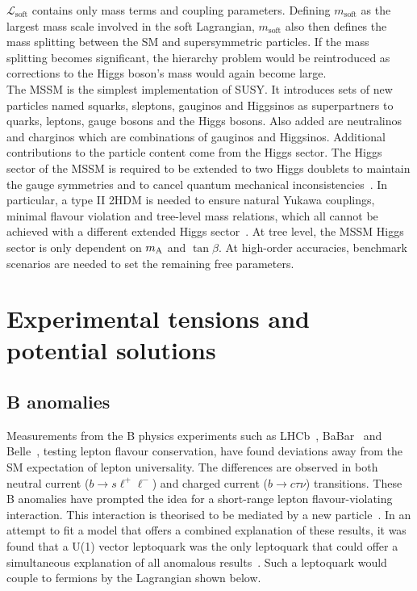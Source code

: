 $\mathcal{L}_{\text{soft}}$ contains only mass terms and coupling parameters. 
Defining $m_{\text{soft}}$ as the largest mass scale involved in the soft Lagrangian, $m_{\text{soft}}$ also then defines the mass splitting between the \ac{SM} and supersymmetric particles. 
If the mass splitting becomes significant, the hierarchy problem would be reintroduced as corrections to the Higgs boson's mass would again become large. \\

The \ac{MSSM} is the simplest implementation of \ac{SUSY}.
It introduces sets of new particles named squarks, sleptons, gauginos and Higgsinos as superpartners to quarks, leptons, gauge bosons and the Higgs bosons.
Also added are neutralinos and charginos which are combinations of gauginos and Higgsinos.
Additional contributions to the particle content come from the Higgs sector.
The Higgs sector of the \ac{MSSM} is required to be extended to two Higgs doublets to maintain the gauge symmetries and to cancel quantum mechanical inconsistencies~\cite{SUSY_Primer}.
In particular, a type II \ac{2HDM} is needed to ensure natural Yukawa couplings, minimal flavour violation and tree-level mass relations, which all cannot be achieved with a different extended Higgs sector~\cite{SUSY_Primer}.
At tree level, the \ac{MSSM} Higgs sector is only dependent on $m_{{\text{A}}}$ and $\tan\beta$.
At high-order accuracies, benchmark scenarios are needed to set the remaining free parameters.

\section{Experimental tensions and potential solutions}

\subsection{B anomalies}
\label{sec:b_anomalies}

Measurements from the B physics experiments such as LHCb~\cite{LHCb:2021trn,LHCb:2015gmp,LHCb:2017rln,LHCb:2017smo}, BaBar~\cite{Kowalewski:2013mna,BaBar:2013mob} and Belle~\cite{Belle:2015qfa,Belle:2016dyj}, testing lepton flavour conservation, have found deviations away from the \ac{SM} expectation of lepton universality.
The differences are observed in both neutral current ($b\rightarrow s\ell^{+}\ell^{-}$) and charged current ($b\rightarrow c\tau\nu$) transitions.
These B anomalies have prompted the idea for a short-range lepton flavour-violating interaction.
This interaction is theorised to be mediated by a new  particle~\cite{Diaz:2017lit,Schmaltz:2018nls}.
In an attempt to fit a model that offers a combined explanation of these results, it was found that a U(1) vector leptoquark was the only leptoquark that could offer a simultaneous explanation of all anomalous results~\cite{Cornella:2021sby}. 
Such a leptoquark would couple to fermions by the Lagrangian shown below.

